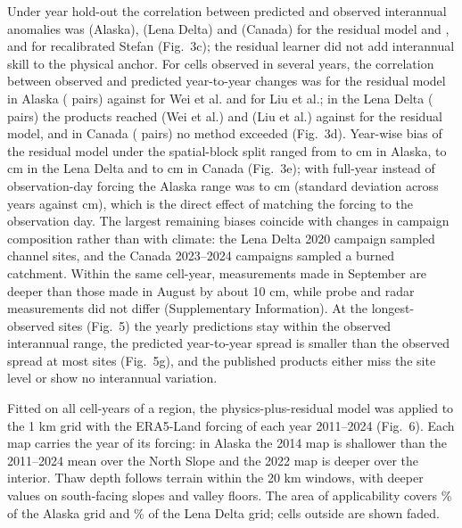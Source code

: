 Under year hold-out the correlation between predicted and observed interannual anomalies was \nranomAkyrRo{} (Alaska), \nranomLeyrRo{} (Lena Delta) and \nranomCayrRo{} (Canada) for the residual model and \nranomAkyrPo{}, \nranomLeyrPo{} and \nranomCayrPo{} for recalibrated Stefan (Fig.~3c); the residual learner did not add interannual skill to the physical anchor. For cells observed in several years, the correlation between observed and predicted year-to-year changes was \nrdeltaAkRo{} for the residual model in Alaska (\nnpairsAk{} pairs) against \nrdeltaAkWei{} for Wei et al. and \nrdeltaAkLiu{} for Liu et al.; in the Lena Delta (\nnpairsLe{} pairs) the products reached \nrdeltaLeWei{} (Wei et al.) and \nrdeltaLeLiu{} (Liu et al.) against \nrdeltaLeRo{} for the residual model, and in Canada (\nnpairsCa{} pairs) no method exceeded \nrdeltaCaLiu{} (Fig.~3d). Year-wise bias of the residual model under the spatial-block split ranged from \nybiasminAk{} to \nybiasmaxAk{} cm in Alaska, \nybiasminLe{} to \nybiasmaxLe{} cm in the Lena Delta and \nybiasminCa{} to \nybiasmaxCa{} cm in Canada (Fig.~3e); with full-year instead of observation-day forcing the Alaska range was \nybiasminAkYr{} to \nybiasmaxAkYr{} cm (standard deviation across years \nybiassdAkYr{} against \nybiassdAk{} cm), which is the direct effect of matching the forcing to the observation day. The largest remaining biases coincide with changes in campaign composition rather than with climate: the Lena Delta 2020 campaign sampled channel sites, and the Canada 2023--2024 campaigns sampled a burned catchment. Within the same cell-year, measurements made in September are deeper than those made in August by about 10 cm, while probe and radar measurements did not differ (Supplementary Information). At the longest-observed sites (Fig.~5) the yearly predictions stay within the observed interannual range, the predicted year-to-year spread is smaller than the observed spread at most sites (Fig.~5g), and the published products either miss the site level or show no interannual variation.

Fitted on all cell-years of a region, the physics-plus-residual model was applied to the 1 km grid with the ERA5-Land forcing of each year 2011--2024 (Fig.~6). Each map carries the year of its forcing: in Alaska the 2014 map is shallower than the 2011--2024 mean over the North Slope and the 2022 map is deeper over the interior. Thaw depth follows terrain within the 20 km windows, with deeper values on south-facing slopes and valley floors. The area of applicability covers \naoaAk{}\% of the Alaska grid and \naoaLe{}\% of the Lena Delta grid; cells outside are shown faded.
